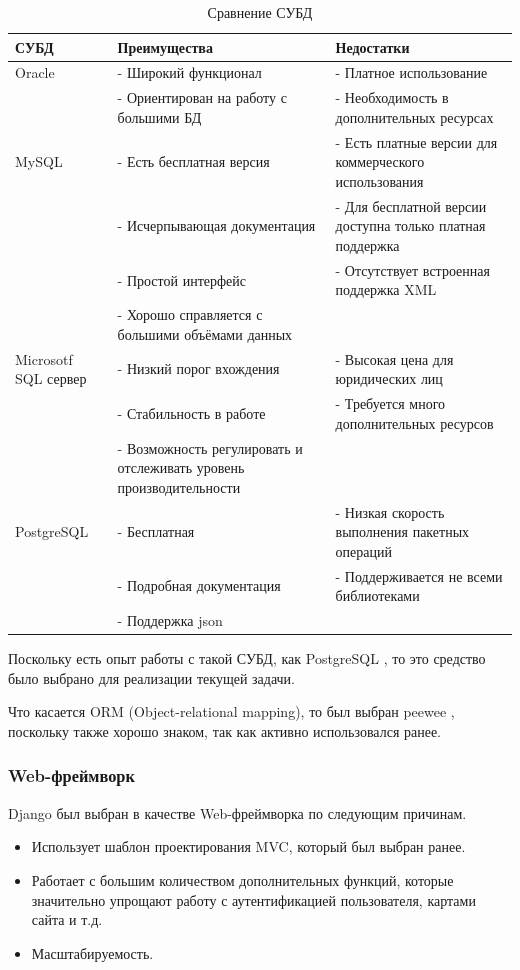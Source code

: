 		\begin{table}[pt!] 
			\begin{center}
				\caption{Сравнение СУБД}
				\label{cmptable}
				\begin{tabular}{| p{4cm} | p{5cm} | p{5cm} |}
					\hline
					\textbf{СУБД} 	& \textbf{Преимущества} & \textbf{Недостатки} \\
					\hline
					Oracle 			& - Широкий функционал & - Платное использование \\ 
									& - Ориентирован на работу с большими БД & - Необходимость в дополнительных ресурсах \\
					\hline
					MySQL 			& - Есть бесплатная версия & - Есть платные версии для коммерческого использования\\
									& - Исчерпывающая документация & - Для бесплатной версии доступна только платная поддержка \\ 
									& - Простой интерфейс & - Отсутствует встроенная поддержка XML \\
									& - Хорошо справляется с большими объёмами данных &  \\
					\hline
					Microsotf SQL сервер  	& - Низкий порог вхождения &- Высокая цена для юридических лиц \\
					 				& - Стабильность в работе & - Требуется много дополнительных ресурсов \\ 
									& - Возможность регулировать и отслеживать уровень производительности &  \\
					\hline
					PostgreSQL 		& - Бесплатная & - Низкая скорость выполнения пакетных операций \\ 
									& - Подробная документация & - Поддерживается не всеми библиотеками \\
									& - Поддержка json &  \\
					\hline
				\end{tabular}
			\end{center}
		\end{table}
	\newpage
	
	Поскольку есть опыт работы с такой СУБД, как PostgreSQL \cite{postgresql}, то это средство было выбрано для реализации текущей задачи.
	
	Что касается ORM (Object-relational mapping), то был выбран peewee \cite{peewee}, поскольку также хорошо знаком, так как активно использовался ранее.
	
	\subsubsection{Web-фреймворк}
	Django \cite{django} был выбран в качестве Web-фреймворка по следующим причинам.
	\begin{itemize}
		\item Использует шаблон проектирования MVC, который был выбран ранее.
		\item Работает с большим количеством дополнительных функций, которые значительно упрощают работу с аутентификацией пользователя, картами сайта и т.д.
		\item Масштабируемость.
	\end{itemize}

